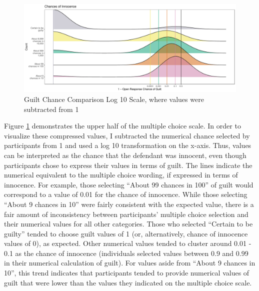 \documentclass[print]{nuthesis}
\begin{document}
\begin{figure}

{\centering \includegraphics[width=\linewidth]{thesis_files/figure-latex/likecomp1scalerev-1} 

}

\caption{Guilt Chance Comparison Log 10 Scale, where values were subtracted from 1}\label{fig:likecomp1scalerev}
\end{figure}

Figure \ref{fig:likecomp1scalerev} demonstrates the upper half of the multiple choice scale.
In order to visualize these compressed values, I subtracted the numerical chance selected by participants from 1 and used a log 10 transformation on the x-axis.
Thus, values can be interpreted as the chance that the defendant was innocent, even though participants chose to express their values in terms of guilt.
The lines indicate the numerical equivalent to the multiple choice wording, if expressed in terms of innocence.
For example, those selecting ``About 99 chances in 100'' of guilt would correspond to a value of 0.01 for the chance of innocence.
While those selecting ``About 9 chances in 10'' were fairly consistent with the expected value, there is a fair amount of inconsistency between participants' multiple choice selection and their numerical values for all other categories.
Those who selected ``Certain to be guilty'' tended to choose guilt values of 1 (or, alternatively, chance of innocence values of 0), as expected.
Other numerical values tended to cluster around 0.01 - 0.1 as the chance of innocence (individuals selected values between 0.9 and 0.99 in their numerical calculation of guilt).
For values aside from ``About 9 chances in 10'', this trend indicates that participants tended to provide numerical values of guilt that were lower than the values they indicated on the multiple choice scale.
\end{document}
